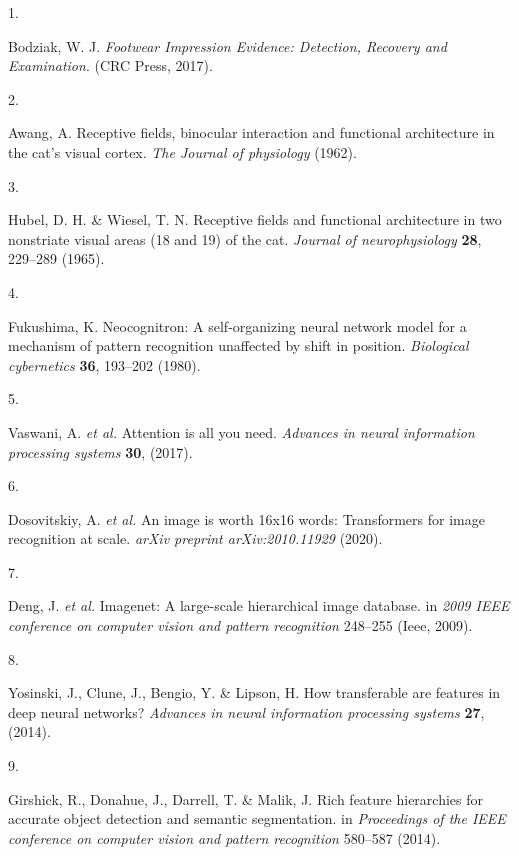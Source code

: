 \documentclass[
  letterpaper,
  DIV=11,
  numbers=noendperiod]{scrartcl}
\newlength{\cslhangindent}
\newlength{\csllabelwidth}
\newenvironment{CSLReferences}[2] %
 {\begin{list}{}{%
  \setlength{\itemindent}{0pt}
  \setlength{\leftmargin}{0pt}
  \setlength{\parsep}{0pt}
  \ifodd #1
   \setlength{\leftmargin}{\cslhangindent}
   \setlength{\itemindent}{-1\cslhangindent}
  \fi
  \setlength{\itemsep}{#2\baselineskip}}}
 {\end{list}}
\newcommand{\CSLLeftMargin}[1]{\parbox[t]{\csllabelwidth}{\strut#1\strut}}
\newcommand{\CSLRightInline}[1]{\parbox[t]{\linewidth - \csllabelwidth}{\strut#1\strut}}
\begin{document}
\label{refs}
\begin{CSLReferences}{0}{0}
\CSLLeftMargin{1. }%
\CSLRightInline{Bodziak, W. J. \emph{Footwear Impression Evidence:
Detection, Recovery and Examination}. (CRC Press, 2017).}

\CSLLeftMargin{2. }%
\CSLRightInline{Awang, A. Receptive fields, binocular interaction and
functional architecture in the cat's visual cortex. \emph{The Journal of
physiology} (1962).}

\CSLLeftMargin{3. }%
\CSLRightInline{Hubel, D. H. \& Wiesel, T. N. Receptive fields and
functional architecture in two nonstriate visual areas (18 and 19) of
the cat. \emph{Journal of neurophysiology} \textbf{28}, 229--289
(1965).}

\CSLLeftMargin{4. }%
\CSLRightInline{Fukushima, K. Neocognitron: A self-organizing neural
network model for a mechanism of pattern recognition unaffected by shift
in position. \emph{Biological cybernetics} \textbf{36}, 193--202
(1980).}

\CSLLeftMargin{5. }%
\CSLRightInline{Vaswani, A. \emph{et al.} Attention is all you need.
\emph{Advances in neural information processing systems} \textbf{30},
(2017).}

\CSLLeftMargin{6. }%
\CSLRightInline{Dosovitskiy, A. \emph{et al.} An image is worth 16x16
words: Transformers for image recognition at scale. \emph{arXiv preprint
arXiv:2010.11929} (2020).}

\CSLLeftMargin{7. }%
\CSLRightInline{Deng, J. \emph{et al.} Imagenet: A large-scale
hierarchical image database. in \emph{2009 IEEE conference on computer
vision and pattern recognition} 248--255 (Ieee, 2009).}

\CSLLeftMargin{8. }%
\CSLRightInline{Yosinski, J., Clune, J., Bengio, Y. \& Lipson, H. How
transferable are features in deep neural networks? \emph{Advances in
neural information processing systems} \textbf{27}, (2014).}

\CSLLeftMargin{9. }%
\CSLRightInline{Girshick, R., Donahue, J., Darrell, T. \& Malik, J. Rich
feature hierarchies for accurate object detection and semantic
segmentation. in \emph{Proceedings of the IEEE conference on computer
vision and pattern recognition} 580--587 (2014).}


\end{CSLReferences}
\end{document}
